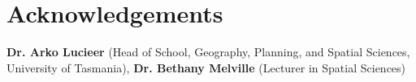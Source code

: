 \documentclass{thesis}
\begin{document}
\clearpage

\chapter*{Acknowledgements}

\ifdrafting\else
\textbf{Dr. Arko Lucieer} (Head of School, Geography, Planning, and Spatial Sciences, University of Tasmania), 
\textbf{Dr. Bethany Melville} (Lecturer in Spatial Sciences) 
\newpage

\vspace{5mm}
\begin{quotation}
\end{quotation}

\begin{quotation}
\end{quotation}

\contentspage
\pagestyle{header-footer}



\end{document}
